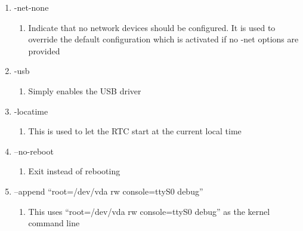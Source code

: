 \documentclass[letterpaper,10pt,fleqn]{article}
\begin{document}
\begin{enumerate}
\item -net-none
	\begin{enumerate}
		\item Indicate that no network devices should be configured. It is used to override the default configuration which is activated if no -net options are provided
	\end{enumerate}

\item -usb
	\begin{enumerate}
		\item Simply enables the USB driver
	\end{enumerate}

\item -locatime
	\begin{enumerate}
		\item This is used to let the RTC start at the current local time
	\end{enumerate}

\item --no-reboot
	\begin{enumerate}
	\item Exit instead of rebooting
	\end{enumerate}

\item --append “root=/dev/vda rw console=ttyS0 debug”
	\begin{enumerate}
	\item This uses “root=/dev/vda rw console=ttyS0 debug” as the kernel command line
	\end{enumerate}

\end{enumerate}
\end{document}
